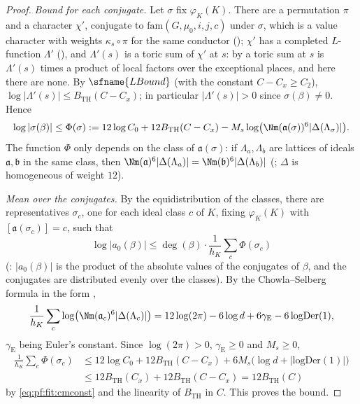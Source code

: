 \begin{proof}
\emph{Bound for each conjugate.} Let $\sigma$ fix $\varphi_K(K)$. There are a permutation $\pi$ and a character $\chi'$, conjugate
to $\mathrm{fam}(G,\mu_0,i,j,c)$ under $\sigma$, which is a value character with weights $\kappa_s\circ\pi$ for the same conductor
(); $\chi'$ has a completed $L$-function $\Lambda'$
(), and $\Lambda'(s)$ is a toric sum of $\chi'$ at $s$:
by  a toric sum at $s$ is $\Lambda'(s)$ times a product of local factors over
the exceptional places, and here there are none. By $\sfname{LBound}$ (with the constant $C-C_x\ge C_2$), $\log|\Lambda'(s)|\le B_{\mathrm{TH}}(C-C_x)$;
in particular $|\Lambda'(s)|>0$ since $\sigma(\beta)\ne0$. Hence
\[
\log|\sigma(\beta)|\le\Phi(\sigma):=12\log C_0+12B_{\mathrm{TH}}(C-C_x)-M_s\log\bigl(\Nm(\mathfrak a(\sigma))^6|\Delta(\Lambda_\sigma)|\bigr).
\]
The function $\Phi$ only depends on the class of $\mathfrak a(\sigma)$: if $\Lambda_a,\Lambda_b$ are lattices of ideals
$\mathfrak a,\mathfrak b$ in the same class, then $\Nm(\mathfrak a)^6|\Delta(\Lambda_a)|=\Nm(\mathfrak b)^6|\Delta(\Lambda_b)|$
(; $\Delta$ is homogeneous of weight $12$).

\emph{Mean over the conjugates.} By the equidistribution of the classes, there are representatives $\sigma_c$, one for each
ideal class $c$ of $K$, fixing $\varphi_K(K)$ with $[\mathfrak a(\sigma_c)]=c$, such that
\[
\log|a_0(\beta)|\le\deg(\beta)\cdot\frac1{h_K}\sum_c\Phi(\sigma_c)
\]
(: $|a_0(\beta)|$ is the product of the absolute values of
the conjugates of $\beta$, and the conjugates are distributed evenly over the classes). By the Chowla--Selberg formula
\cite{ChowlaSelberg1967} in the form ,
\[
\frac1{h_K}\sum_c\log\bigl(\Nm(\mathfrak a_c)^6|\Delta(\Lambda_c)|\bigr)=12\log(2\pi)-6\log d+6\gamma_{\mathrm E}-6\,\mathrm{logDer}(1),
\]
$\gamma_{\mathrm E}$ being Euler's constant. Since $\log(2\pi)>0$, $\gamma_{\mathrm E}\ge0$ and $M_s\ge0$,
\begin{align*}
\frac1{h_K}\sum_c\Phi(\sigma_c)&\le12\log C_0+12B_{\mathrm{TH}}(C-C_x)+6M_s\bigl(\log d+|\mathrm{logDer}(1)|\bigr)\\
&\le12B_{\mathrm{TH}}(C_x)+12B_{\mathrm{TH}}(C-C_x)=12B_{\mathrm{TH}}(C)
\end{align*}
by \eqref{eq:pf:fit:cmconst} and the linearity of $B_{\mathrm{TH}}$ in $C$. This proves the bound.
\end{proof}

